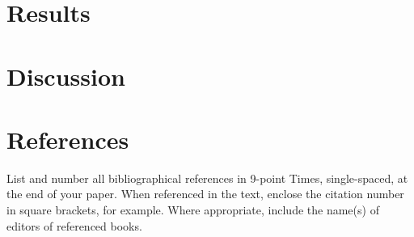 \documentclass[10pt,twocolumn,letterpaper]{article}
\begin{document}
\section{Results}

\section{Discussion}




\section{References}

List and number all bibliographical references in 9-point Times,
single-spaced, at the end of your paper. When referenced in the text,
enclose the citation number in square brackets, for
example.  Where appropriate, include the name(s) of
editors of referenced books.

%
%
\end{document}
